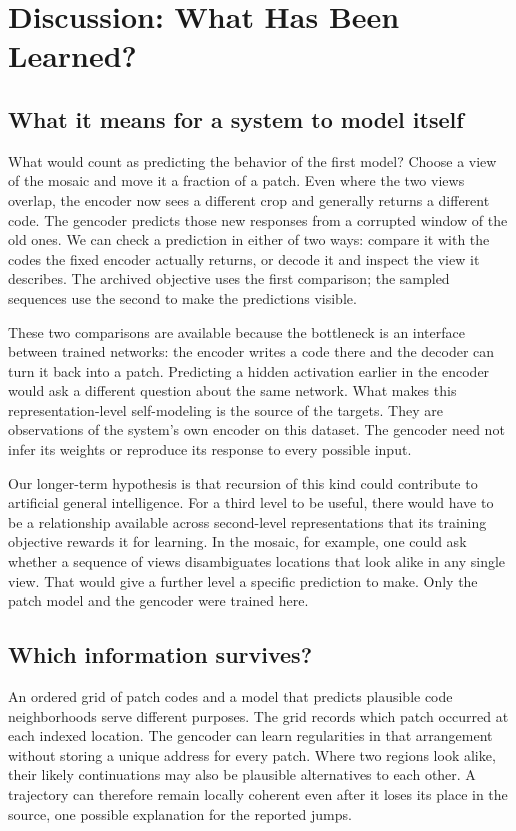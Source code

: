 \section{Discussion: What Has Been Learned?}
\label{sec:discussion}

\subsection{What it means for a system to model itself}
\label{sec:recursive-discussion}

What would count as predicting the behavior of the first model? Choose a view of the mosaic and move it a fraction of a patch. Even where the two views overlap, the encoder now sees a different crop and generally returns a different code. The gencoder predicts those new responses from a corrupted window of the old ones. We can check a prediction in either of two ways: compare it with the codes the fixed encoder actually returns, or decode it and inspect the view it describes. The archived objective uses the first comparison; the sampled sequences use the second to make the predictions visible.

These two comparisons are available because the bottleneck is an interface between trained networks: the encoder writes a code there and the decoder can turn it back into a patch. Predicting a hidden activation earlier in the encoder would ask a different question about the same network. What makes this representation-level self-modeling is the source of the targets. They are observations of the system's own encoder on this dataset. The gencoder need not infer its weights or reproduce its response to every possible input.

Our longer-term hypothesis is that recursion of this kind could contribute to artificial general intelligence. For a third level to be useful, there would have to be a relationship available across second-level representations that its training objective rewards it for learning. In the mosaic, for example, one could ask whether a sequence of views disambiguates locations that look alike in any single view. That would give a further level a specific prediction to make. Only the patch model and the gencoder were trained here.

\subsection{Which information survives?}

An ordered grid of patch codes and a model that predicts plausible code neighborhoods serve different purposes. The grid records which patch occurred at each indexed location. The gencoder can learn regularities in that arrangement without storing a unique address for every patch. Where two regions look alike, their likely continuations may also be plausible alternatives to each other. A trajectory can therefore remain locally coherent even after it loses its place in the source, one possible explanation for the reported jumps.

